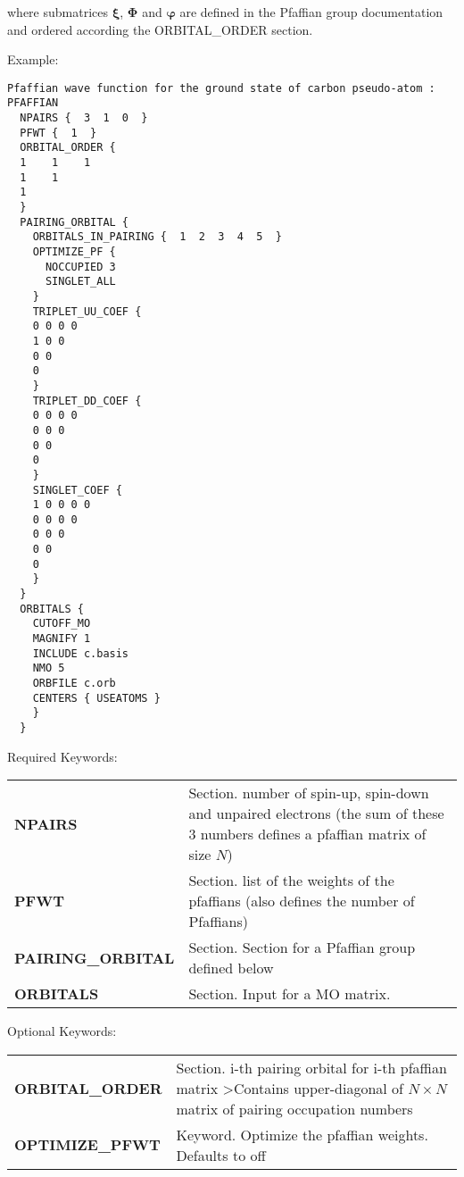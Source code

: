 \documentclass[12pt]{article}
\begin{document}
where submatrices $ \boldsymbol \xi $, $ \boldsymbol  \Phi $ and $ \boldsymbol \varphi $ are defined in the Pfaffian group documentation
and ordered according the ORBITAL\_ORDER section.

Example:
\begin{verbatim}
Pfaffian wave function for the ground state of carbon pseudo-atom :
PFAFFIAN
  NPAIRS {  3  1  0  }
  PFWT {  1  }
  ORBITAL_ORDER {
  1    1    1
  1    1
  1
  }
  PAIRING_ORBITAL {
    ORBITALS_IN_PAIRING {  1  2  3  4  5  }
    OPTIMIZE_PF {
      NOCCUPIED 3
      SINGLET_ALL
    }
    TRIPLET_UU_COEF {
    0 0 0 0
    1 0 0
    0 0
    0
    }
    TRIPLET_DD_COEF {
    0 0 0 0
    0 0 0
    0 0
    0
    }
    SINGLET_COEF {
    1 0 0 0 0
    0 0 0 0
    0 0 0
    0 0
    0
    }
  }
  ORBITALS {
    CUTOFF_MO 
    MAGNIFY 1 
    INCLUDE c.basis 
    NMO 5 
    ORBFILE c.orb 
    CENTERS { USEATOMS }
    }
  }
\end{verbatim}

Required Keywords: \\
\begin{tabular}{lp{12cm}}
{\bf NPAIRS} & Section. number of spin-up, spin-down and unpaired electrons (the sum of these 3 numbers defines
 a pfaffian matrix of size $ N $)  \\
{\bf PFWT } & Section. list of the weights of the pfaffians (also defines the number of Pfaffians) \\
{\bf PAIRING\_ORBITAL} & Section. Section for a Pfaffian group defined below\\
{\bf ORBITALS} & Section.  Input for a MO matrix. \\
\end{tabular}

Optional Keywords: \\
\begin{tabular}{lp{12cm}}
{\bf ORBITAL\_ORDER} &  Section.  i-th pairing orbital for i-th pfaffian matrix 
>Contains upper-diagonal of $ N \times N $ matrix of pairing occupation numbers \\
{\bf OPTIMIZE\_PFWT} & Keyword. Optimize the pfaffian weights. Defaults to off \\
\end{tabular}
\end{document}
